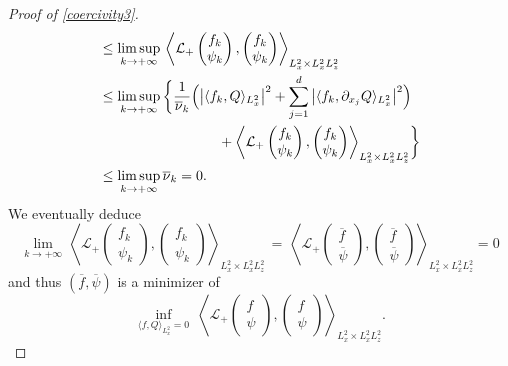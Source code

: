 \documentclass[10pt]{amsart}
\let\bar\oldbar
\theoremstyle{definition}
\let\bar\overline
\newenvironment{ProofOf}[1]{\begin{proof}[Proof of #1]}{\end{proof}}
\begin{document}
\begin{ProofOf}{\eqref{coercivity3}}
\begin{align*}
&\leq\underset{k\to+\infty}{\limsup}\,\left\langle\mathcal{L}_{+}\begin{pmatrix} f_{k}\\\psi_{k} \end{pmatrix},\begin{pmatrix} f_{k}\\\psi_{k} \end{pmatrix}\right\rangle_{L_{x}^{2}\times L_{x}^{2}L_{z}^{2}}\\
&\leq\underset{k\to +\infty}{\limsup}\,\biggl\{\frac{1}{\bar{\nu}_{k}}\Bigl(\left|\langle f_{k},Q\rangle_{L_{x}^{2}}\right|^{2}
+\sum\limits_{j=1}^{d}\left|\langle f_{k},\partial_{x_{j}}Q\rangle_{L_{x}^{2}}\right|^{2}\Bigr)
\\
&\hspace*{3cm}+\left\langle\mathcal{L}_{+}\begin{pmatrix} f_{k}\\\psi_{k} \end{pmatrix},\begin{pmatrix} f_{k}\\\psi_{k} \end{pmatrix}\right\rangle_{L_{x}^{2}\times L_{x}^{2}L_{z}^{2}}\biggr\}\\
&\leq\underset{k\to+\infty}{\limsup}\,\bar{\nu}_{k}=0.
\end{align*}
We eventually deduce
\begin{equation}\label{cv_LL+}
\underset{k\to+\infty}{\lim}\,\left\langle\mathcal{L}_{+}\begin{pmatrix} f_{k}\\\psi_{k} \end{pmatrix},\begin{pmatrix} f_{k}\\\psi_{k} \end{pmatrix}\right\rangle_{L_{x}^{2}\times L_{x}^{2}L_{z}^{2}}\,=\, \left\langle\mathcal{L}_{+}\begin{pmatrix} \bar{f}\\\bar{\psi} \end{pmatrix},\begin{pmatrix} \bar{f}\\\bar{\psi} \end{pmatrix}\right\rangle_{L_{x}^{2}\times L_{x}^{2}L_{z}^{2}}=0
\end{equation}
and thus $(\bar{f},\bar{\psi})$ is a minimizer of
\begin{equation}\label{min_LL+}
\underset{\langle f,Q\rangle_{L_{x}^{2}}=0}{\inf}\;\left\langle\mathcal{L}_{+}\begin{pmatrix} f\\\psi \end{pmatrix},\begin{pmatrix} f\\\psi \end{pmatrix}\right\rangle_{L_{x}^{2}\times L_{x}^{2}L_{z}^{2}}.

\end{equation}
\end{ProofOf}
\end{document}

